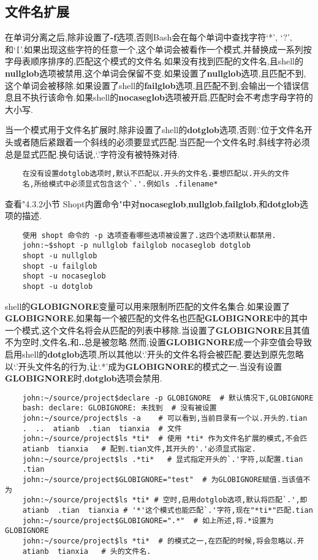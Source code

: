 \documentclass[draft,openany]{book}
\begin{document}
\begin{CJK}{UTF8}{gbsn}
    \subsection{文件名扩展}
    在单词分离之后,除非设置了\textbf{-f}选项,否则Bash会在每个单词中查找字符`*', `?', 和`\verb+[+'.如果出现这些字符的任意一个,这个单词会被看作一个模式,并替换成一系列按字母表顺序排序的,匹配这个模式的文件名.如果没有找到匹配的文件名,且shell的\textbf{nullglob}选项被禁用,这个单词会保留不变.如果设置了\textbf{nullglob}选项,且匹配不到,这个单词会被移除.如果设置了shell的\textbf{failglob}选项,且匹配不到,会输出一个错误信息且不执行该命令.如果shell的\textbf{nocaseglob}选项被开启,匹配时会不考虑字母字符的大小写.\par
    当一个模式用于文件名扩展时,除非设置了shell的\textbf{dotglob}选项,否则`.'位于文件名开头或者随后紧跟着一个斜线的必须要显式匹配.当匹配一个文件名时,斜线字符必须总是显式匹配.换句话说,`.'字符没有被特殊对待.\par
    \begin{verbatim}
    在没有设置dotglob选项时,默认不匹配以.开头的文件名.要想匹配以.开头的文件
    名,所给模式中必须显式包含这个`.'.例如ls .filename*
    \end{verbatim}
    查看"4.3.2小节 Shopt内置命令"中对\textbf{nocaseglob},\textbf{nullglob},\textbf{failglob},和\textbf{dotglob}选项的描述.
    \begin{verbatim}
    使用 shopt 命令的 -p 选项查看哪些选项被设置了.这四个选项默认都禁用.
    john:~$shopt -p nullglob failglob nocaseglob dotglob
    shopt -u nullglob
    shopt -u failglob
    shopt -u nocaseglob
    shopt -u dotglob
    \end{verbatim}
    shell的\textbf{GLOBIGNORE}变量可以用来限制所匹配的文件名集合.如果设置了\textbf{GLOBIGNORE},如果每一个被匹配的文件名也匹配\textbf{GLOBIGNORE}中的其中一个模式,这个文件名将会从匹配的列表中移除.当设置了\textbf{GLOBIGNORE}且其值不为空时,文件名\textbf{.}和\textbf{..}总是被忽略.然而,设置\textbf{GLOBIGNORE}成一个非空值会导致启用shell的\textbf{dotglob}选项,所以其他以`.'开头的文件名将会被匹配.要达到原先忽略以`.'开头文件名的行为,让`.*'成为\textbf{GLOBIGNORE}的模式之一.当没有设置\textbf{GLOBIGNORE}时,\textbf{dotglob}选项会禁用.
    \begin{verbatim}
    john:~/source/project$declare -p GLOBIGNORE  # 默认情况下,GLOBIGNORE
    bash: declare: GLOBIGNORE: 未找到  # 没有被设置
    john:~/source/project$ls -a    # 可以看到,当前目录有一个以.开头的.tian
    .  ..  atianb  .tian  tianxia  # 文件
    john:~/source/project$ls *ti*  # 使用 *ti* 作为文件名扩展的模式,不会匹
    atianb  tianxia   # 配到.tian文件,其开头的'.'必须显式指定.
    john:~/source/project$ls .*ti*   # 显式指定开头的`.'字符,以配置.tian
    .tian
    john:~/source/project$GLOBIGNORE="test"  # 为GLOBIGNORE赋值.当该值不为
    john:~/source/project$ls *ti* # 空时,启用dotglob选项,默认将匹配`.',即
    atianb  .tian  tianxia # '*'这个模式也能匹配`.'字符,现在"*ti*"匹配.tian
    john:~/source/project$GLOBIGNORE=".*"  # 如上所述,将.*设置为GLOBIGNORE
    john:~/source/project$ls *ti*  # 的模式之一,在匹配的时候,将会忽略以.开
    atianb  tianxia   # 头的文件名.
    \end{verbatim}


\end{CJK}
\end{document}
